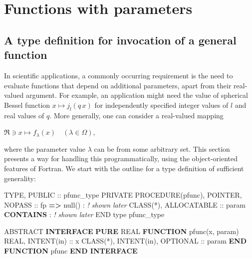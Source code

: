 \documentclass[
  paper=a4,
  ,captions=tableheading
]{scrartcl}
\newenvironment{Shaded}{\begin{snugshade}}{\end{snugshade}}
\newcommand{\CommentTok}[1]{\textcolor[rgb]{0.56,0.35,0.01}{\textit{#1}}}
\newcommand{\DataTypeTok}[1]{\textcolor[rgb]{0.13,0.29,0.53}{#1}}
\newcommand{\KeywordTok}[1]{\textcolor[rgb]{0.13,0.29,0.53}{\textbf{#1}}}
\newcommand{\NormalTok}[1]{#1}
\newcommand{\OperatorTok}[1]{\textcolor[rgb]{0.81,0.36,0.00}{\textbf{#1}}}
\begin{document}
\section{Functions with parameters}\label{sec:functions_with_parameters}

\subsection{A type definition for invocation of a general
function}\label{a-type-definition-for-invocation-of-a-general-function}

In scientific applications, a commonly occurring requirement is the need
to evaluate functions that depend on additional parameters, apart from
their real-valued argument. For example, an application might need the
value of spherical Bessel function \(x \mapsto j_l(q \, x)\) for
independently specified integer values of \(l\) and real values of
\(q\). More generally, one can consider a real-valued mapping

\(\Re \ni x \mapsto f_\lambda(x) \quad (\lambda \in \Omega)\),

where the parameter value \(\lambda\) can be from some arbitrary set.
This section presents a way for handling this programmatically, using
the object-oriented features of Fortran. We start with the outline for a
type definition of sufficient generality:

\begin{Shaded}
\begin{Highlighting}[]
\DataTypeTok{TYPE}\NormalTok{, }\DataTypeTok{PUBLIC} \DataTypeTok{::}\NormalTok{ pfunc\_type}
   \DataTypeTok{PRIVATE}
   \DataTypeTok{PROCEDURE(pfunc)}\NormalTok{, }\DataTypeTok{POINTER}\NormalTok{, }\DataTypeTok{NOPASS} \DataTypeTok{::}\NormalTok{ fp }\KeywordTok{=}\OperatorTok{\textgreater{}}\NormalTok{ null()}
\NormalTok{   : }\CommentTok{! shown later}
   \DataTypeTok{CLASS(*)}\NormalTok{, }\DataTypeTok{ALLOCATABLE} \DataTypeTok{::}\NormalTok{ param}
\KeywordTok{CONTAINS}
\NormalTok{   : }\CommentTok{! shown later}
\DataTypeTok{END type}\NormalTok{ pfunc\_type}

\DataTypeTok{ABSTRACT} \KeywordTok{INTERFACE}
   \KeywordTok{PURE} \DataTypeTok{REAL} \KeywordTok{FUNCTION}\NormalTok{ pfunc(x, param)}
      \DataTypeTok{REAL}\NormalTok{, }\DataTypeTok{INTENT(in)} \DataTypeTok{::}\NormalTok{ x}
      \DataTypeTok{CLASS(*)}\NormalTok{, }\DataTypeTok{INTENT(in)}\NormalTok{, }\DataTypeTok{OPTIONAL} \DataTypeTok{::}\NormalTok{ param}
   \KeywordTok{END FUNCTION}\NormalTok{ pfunc}
\KeywordTok{END INTERFACE}
\end{Highlighting}
\end{Shaded}
\end{document}
